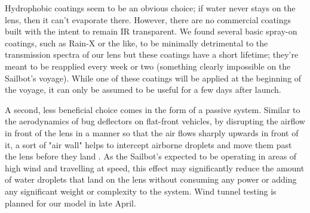 Hydrophobic coatings seem to be an obvious choice; if water never stays on the lens, then it can't evaporate there. However, there are no commercial coatings built with the intent to remain IR transparent. We found several basic spray-on coatings, such as Rain-X or the like, to be minimally detrimental to the transmission spectra of our lens but these coatings have a short lifetime; they're meant to be reapplied every week or two (something clearly impossible on the Sailbot's voyage). While one of these coatings will be applied at the beginning of the voyage, it can only be assumed to be useful for a few days after launch.

A second, less beneficial choice comes in the form of a passive system. Similar to the aerodynamics of bug deflectors on flat-front vehicles, by disrupting the airflow in front of the lens in a manner so that the air flows sharply upwards in front of it, a sort of "air wall" helps to intercept airborne droplets and move them past the lens before they land \cite{bug-deflector}. As the Sailbot's expected to be operating in areas of high wind and travelling at speed, this effect may significantly reduce the amount of water droplets that land on the lens without consuming any power or adding any significant weight or complexity to the system. Wind tunnel testing is planned for our model in late April.
